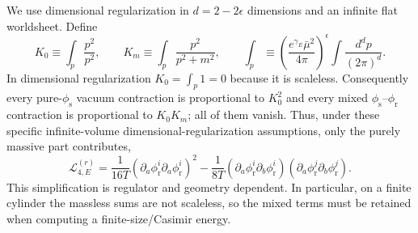We use dimensional regularization in $d=2-2\epsilon$ dimensions and an
infinite flat worldsheet.  Define
\begin{equation}
  K_0 \equiv \int_p \frac{p^2}{p^2},
  \qquad
  K_m \equiv \int_p \frac{p^2}{p^2+m^2},
  \qquad
  \int_p \equiv
  \left(\frac{e^{\gamma_E}\bar\mu^2}{4\pi}\right)^\epsilon
  \int\frac{d^d p}{(2\pi)^d} .
  \label{eq:K0-Km-definitions}
\end{equation}
In dimensional regularization $K_0=\int_p 1=0$ because it is scaleless.
Consequently every pure-$\phi_{\mathrm s}$ vacuum contraction is proportional
to $K_0^2$ and every mixed $\phi_{\mathrm s}$--$\phi_{\mathrm r}$ contraction
is proportional to $K_0K_m$; all of them vanish.  Thus, under these specific
infinite-volume dimensional-regularization assumptions, only the purely
massive part contributes,
\begin{equation}
  \mathcal L_{4,E}^{(r)}
  = \frac{1}{16T}
      \left(\partial_a\phi_{\mathrm r}^i
            \partial_a\phi_{\mathrm r}^i\right)^2
    -\frac{1}{8T}
      \left(\partial_a\phi_{\mathrm r}^i
            \partial_b\phi_{\mathrm r}^i\right)
      \left(\partial_a\phi_{\mathrm r}^j
            \partial_b\phi_{\mathrm r}^j\right).
  \label{eq:massive-only-quartic-euclidean}
\end{equation}
This simplification is regulator and geometry dependent.  In particular, on a
finite cylinder the massless sums are not scaleless, so the mixed terms must
be retained when computing a finite-size/Casimir energy.

